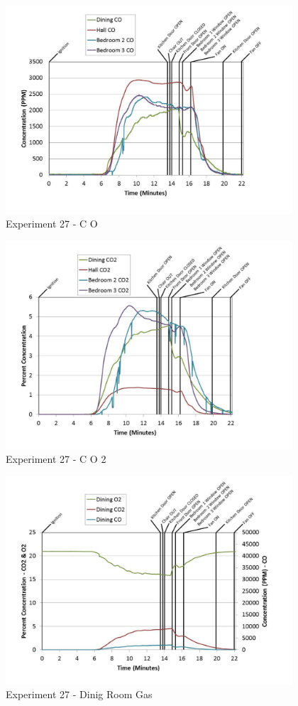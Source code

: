 \documentclass{article}
\begin{document}
\begin{appendices}
	\begin{figure}[h!]
		\centering
		\includegraphics[height=3.05in]{0_Images/Results_Charts/Exp_27_Charts/CO.pdf}
		\caption{Experiment 27 - C O}
	\end{figure}
 
	\clearpage

	\begin{figure}[h!]
		\centering
		\includegraphics[height=3.05in]{0_Images/Results_Charts/Exp_27_Charts/CO2.pdf}
		\caption{Experiment 27 - C O 2}
	\end{figure}
 

	\begin{figure}[h!]
		\centering
		\includegraphics[height=3.05in]{0_Images/Results_Charts/Exp_27_Charts/DinigRoomGas.pdf}
		\caption{Experiment 27 - Dinig Room Gas}
	\end{figure}
 

\end{appendices}
\end{document}
